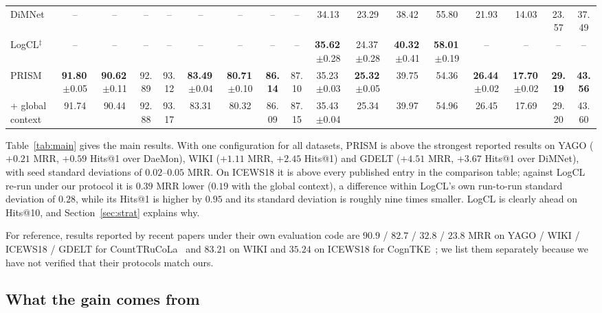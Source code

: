 \documentclass[conference]{IEEEtran}
\newcommand{\sd}[1]{\,{\scriptsize$\pm$#1}}
\begin{document}
\begin{table}[t]
{\begin{tabular}{l cccc cccc cccc cccc}
DiMNet~\cite{dimnet} & -- & -- & -- & -- & -- & -- & -- & --
       & 34.13 & 23.29 & 38.42 & 55.80 & 21.93 & 14.03 & 23.57 & 37.49 \\
LogCL$^\ddagger$~\cite{logcl} & -- & -- & -- & -- & -- & -- & -- & --
       & \textbf{35.62}\sd{0.28} & 24.37\sd{0.28} & \textbf{40.32}\sd{0.41}
       & \textbf{58.01}\sd{0.19} & -- & -- & -- & -- \\
\midrule
PRISM & \textbf{91.80}\sd{0.05} & \textbf{90.62}\sd{0.11} & 92.89 & 93.12
      & \textbf{83.49}\sd{0.04} & \textbf{80.71}\sd{0.10} & \textbf{86.14} & 87.10
      & 35.23\sd{0.03} & \textbf{25.32}\sd{0.05} & 39.75 & 54.36
      & \textbf{26.44}\sd{0.02} & \textbf{17.70}\sd{0.02} & \textbf{29.19}
      & \textbf{43.56} \\
\quad + global context & 91.74 & 90.44 & 92.88 & 93.17
      & 83.31 & 80.32 & 86.09 & 87.15
      & 35.43\sd{0.04} & 25.34 & 39.97 & 54.96
      & 26.45 & 17.69 & 29.20 & 43.60 \\
\bottomrule
\end{tabular}}
\end{table}

Table~\ref{tab:main} gives the main results. With one configuration for all
datasets, PRISM is above the strongest reported results on YAGO ($+0.21$ MRR,
$+0.59$ Hits@1 over DaeMon), WIKI ($+1.11$ MRR, $+2.45$ Hits@1) and GDELT
($+4.51$ MRR, $+3.67$ Hits@1 over DiMNet), with seed standard deviations of
$0.02$--$0.05$ MRR. On ICEWS18 it is above every published entry in the
comparison table; against LogCL re-run under our protocol it is $0.39$ MRR lower
($0.19$ with the global context), a difference within LogCL's own run-to-run
standard deviation of $0.28$, while its Hits@1 is higher by $0.95$ and its
standard deviation is roughly nine times smaller. LogCL is clearly ahead on
Hits@10, and Section~\ref{sec:strat} explains why.

For reference, results reported by recent papers under their own evaluation
code are $90.9$ / $82.7$ / $32.8$ / $23.8$ MRR on YAGO / WIKI / ICEWS18 / GDELT
for CountTRuCoLa~\cite{counttrucola} and $83.21$ on WIKI and $35.24$ on ICEWS18
for CognTKE~\cite{cogntke}; we list them separately because we have not
verified that their protocols match ours.

\subsection{What the gain comes from}
\label{sec:ablation}
\end{document}
